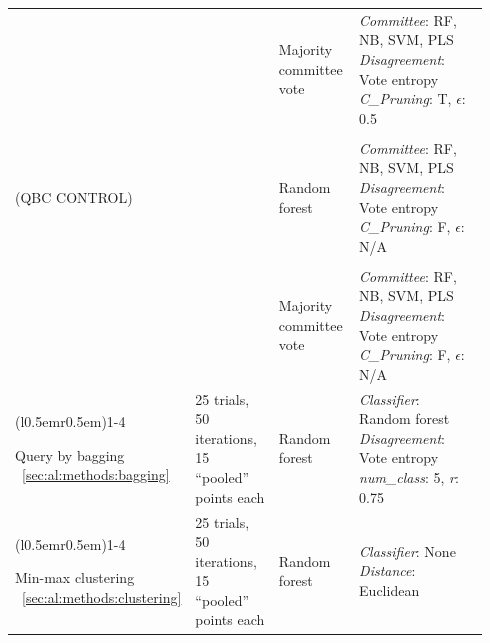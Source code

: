 \begin{longtable}{p{0.15\linewidth} p{0.21\linewidth} p{0.18\linewidth} 
p{0.4\linewidth}}
	& & Majority \newline committee \newline vote &	
	\textit{Committee}: RF, NB, SVM, PLS \newline 
	\textit{Disagreement}: Vote entropy \newline 
	\textit{C\_Pruning}: T, $\epsilon$: 0.5 \\ & \\
	
	(QBC \newline CONTROL) & & Random forest &	
	\textit{Committee}: RF, NB, SVM, PLS \newline 
	\textit{Disagreement}: Vote entropy \newline 
	\textit{C\_Pruning}: F, $\epsilon$: N/A \\ & \\
	
	& & Majority \newline committee \newline vote &	
	\textit{Committee}: RF, NB, SVM, PLS \newline 
	\textit{Disagreement}: Vote entropy \newline 
	\textit{C\_Pruning}: F, $\epsilon$: N/A \\	
	
	\cmidrule[0.1pt](l{0.5em}r{0.5em}){1-4}	
	
	Query by \newline bagging ~\ref{sec:al:methods:bagging} & 
	25 trials, 50 iterations, 15 ``pooled'' points each & 
	Random forest &
	\textit{Classifier}: Random forest \newline \textit{Disagreement}: Vote 
	entropy \newline \textit{num\_class}: 5, \textit{r}: 0.75 \\
		
	\cmidrule[0.1pt](l{0.5em}r{0.5em}){1-4}	
	
	Min-max \newline clustering ~\ref{sec:al:methods:clustering} & 
	25 trials, 50 iterations, 15 ``pooled'' points each & 
	Random forest & 
	\textit{Classifier}: None \newline \textit{Distance}: Euclidean \\
	
\end{longtable}
\bodyspacing

